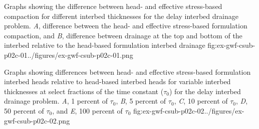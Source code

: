 \begin{StandardFigure}{
                                     Graphs showing the difference between head- and effective 
                                     stress-based compaction for different interbed thicknesses for the 
                                     delay interbed drainage problem. \textit{A}, difference between the 
                                     head- and effective stress-based formulation compaction, and 
                                     \textit{B}, difference between drainage at the top and bottom of the 
                                     interbed relative to the head-based formulation interbed drainage
                                     }{fig:ex-gwf-csub-p02c-01}{../figures/ex-gwf-csub-p02c-01.png}
\end{StandardFigure}         

\begin{StandardFigure}{
                                     Graphs showing differences between head- and effective stress-based 
                                     formulation interbed heads relative to head-based interbed heads for variable 
                                     interbed thicknesses at select fractions of the time constant ($\tau_0$) for the 
                                     delay interbed drainage problem. \textit{A}, 1 percent of $\tau_0$, \textit{B}, 
                                     5 percent of $\tau_0$, \textit{C}, 10 percent of $\tau_0$, \textit{D}, 50 percent 
                                     of $\tau_0$,  and \textit{E}, 100 percent of $\tau_0$
                                     }{fig:ex-gwf-csub-p02c-02}{../figures/ex-gwf-csub-p02c-02.png}
\end{StandardFigure}         



